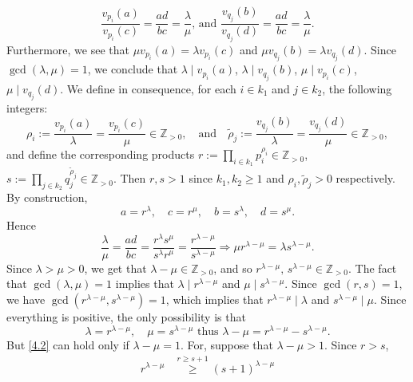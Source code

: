 \begin{solution}
    \[
        \frac{v_{p_i}\left(a\right)}{v_{p_i}\left(c\right)} = \frac{ad}{bc} = \frac{\lambda}{\mu} \text{, and } \frac{v_{q_j}\left(b\right)}{v_{q_j}\left(d\right)} = \frac{ad}{bc} = \frac{\lambda}{\mu}.
    \]
    Furthermore, we see that \( \mu v_{p_i}\left(a\right) = \lambda v_{p_i}\left(c\right) \) and \( \mu v_{q_j}\left(b\right) = \lambda v_{q_j}\left(d\right) \). Since \( \gcd\left(\lambda, \mu\right) = 1 \), we conclude that \( \lambda \mid v_{p_i}\left(a\right) \), \( \lambda \mid v_{q_j}\left(b\right) \), \( \mu \mid v_{p_i}\left(c\right) \), \( \mu \mid v_{q_j}\left(d\right) \). We define in consequence, for each \( i \in k_1 \) and \( j \in k_2 \), the following integers:
    \[
        \rho_i := \frac{v_{p_i}\left(a\right)}{\lambda} = \frac{v_{p_i}\left(c\right)}{\mu} \in \mathbb{Z}_{>0},\quad \text{and} \quad \tilde{\rho}_j := \frac{v_{q_j}\left(b\right)}{\lambda} = \frac{v_{q_j}\left(d\right)}{\mu} \in \mathbb{Z}_{>0},
    \]
    and define the corresponding products \( r := \prod_{i \in k_1} p_i^{\rho_i} \in \mathbb{Z}_{>0} \), \( s := \prod_{j \in k_2} q_j^{\tilde{\rho}_j} \in \mathbb{Z}_{>0} \). Then \( r, s > 1 \) since \( k_1, k_2 \geq 1 \) and \( \rho_i, \tilde{\rho}_j > 0 \) respectively. By construction,
    \[
        a = r^\lambda,\quad c = r^\mu,\quad b = s^\lambda,\quad d = s^\mu.
    \]
    Hence
    \[
        \frac{\lambda}{\mu} = \frac{ad}{bc} = \frac{r^{\lambda}s^{\mu}}{s^{\lambda}r^{\mu}} = \frac{r^{\lambda - \mu}}{s^{\lambda - \mu}} \Rightarrow \mu r^{\lambda - \mu} = \lambda s^{\lambda - \mu}.
    \]
    Since \( \lambda > \mu > 0 \), we get that \( \lambda - \mu \in \mathbb{Z}_{>0} \), and so \( r^{\lambda - \mu},\, s^{\lambda - \mu} \in \mathbb{Z}_{>0} \). The fact that \( \gcd\left(\lambda, \mu\right) = 1 \) implies that \( \lambda \mid r^{\lambda - \mu} \) and \( \mu \mid s^{\lambda - \mu} \). Since \( \gcd\left(r, s\right) = 1 \), we have \( \gcd\left(r^{\lambda - \mu}, s^{\lambda - \mu}\right) = 1 \), which implies that \( r^{\lambda - \mu} \mid \lambda \) and \( s^{\lambda - \mu} \mid \mu \). Since everything is positive, the only possibility is that
    \begin{equation} \label{4.2}
        \lambda = r^{\lambda - \mu}, \quad \mu = s^{\lambda - \mu} \text{ thus } \lambda - \mu = r^{\lambda - \mu} - s^{\lambda - \mu}.
    \end{equation}
    But \eqref{4.2} can hold only if \( \lambda - \mu = 1 \). For, suppose that \( \lambda - \mu > 1 \). Since \( r > s \),
    \begin{align*}
        r^{\lambda - \mu} &\overset{r \geq s + 1}{\geq} (s + 1)^{\lambda - \mu} \\

\end{align*}
\end{solution}
